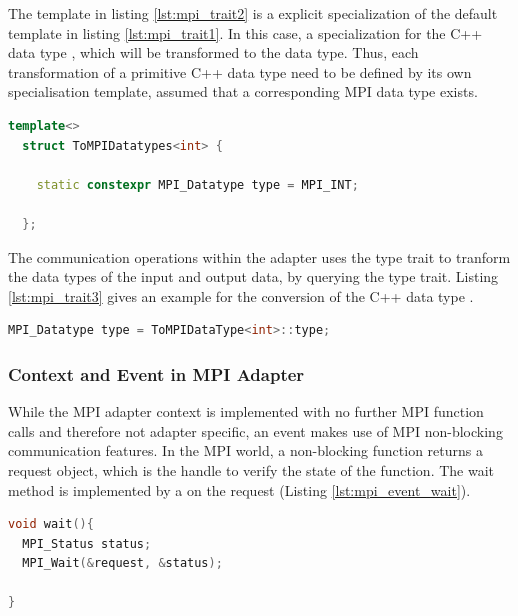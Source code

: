 The template in listing \ref{lst:mpi_trait2} is a explicit
specialization of the default template in listing
\ref{lst:mpi_trait1}. In this case, a specialization for the C++ data
type , which will be transformed to the  data type.  Thus,
each transformation of a primitive C++ data type need to be defined
by its own specialisation template, assumed that a corresponding
MPI data type exists.

\begin{lstlisting}[language=C++, label=lst:mpi_trait2]
  template<>
  struct ToMPIDatatypes<int> { 

    static constexpr MPI_Datatype type = MPI_INT; 

  };
\end{lstlisting}

The communication operations within the adapter uses the type trait to
tranform the data types of the input and output data, by querying the
type trait. Listing \ref{lst:mpi_trait3} gives an example for the conversion 
of the C++ data type .

\begin{lstlisting}[language=C++, label=lst:mpi_trait3]
  MPI_Datatype type = ToMPIDataType<int>::type;
\end{lstlisting}

\subsubsection{Context and Event in MPI Adapter}
While the MPI adapter context is implemented with no further MPI
function calls and therefore not adapter specific, an event makes use
of MPI non-blocking communication features. In the MPI world, a
non-blocking function returns a request object, which is the handle to
verify the state of the function. The wait method is implemented by a
 on the request (Listing \ref{lst:mpi_event_wait}). 

\begin{lstlisting}[language=C++, label=lst:mpi_event_wait]
void wait(){
  MPI_Status status;
  MPI_Wait(&request, &status);

}
\end{lstlisting}

